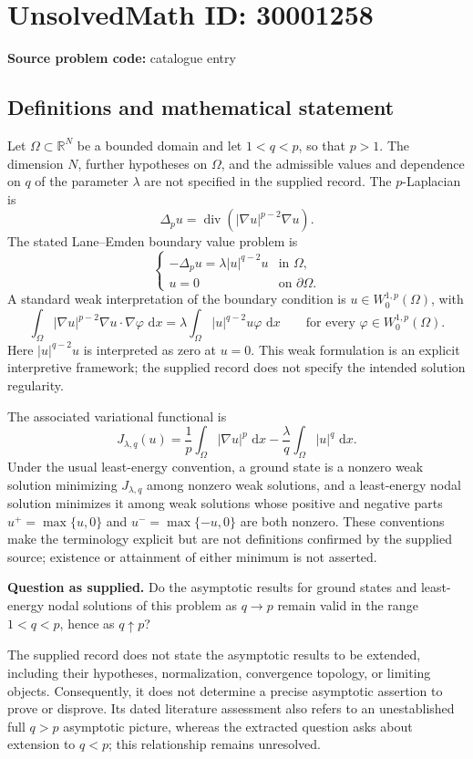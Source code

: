 \documentclass[11pt]{article}
\newcommand{\R}{\mathbb{R}}
\newcommand{\dd}{\,\mathrm{d}}
\begin{document}
\section*{UnsolvedMath ID: 30001258}
\textbf{Source problem code:} catalogue entry
\subsection{Definitions and mathematical statement}
Let \(\Omega\subset\R^N\) be a bounded domain and let \(1<q<p\), so that \(p>1\). The dimension \(N\), further hypotheses on \(\Omega\), and the admissible values and dependence on \(q\) of the parameter \(\lambda\) are not specified in the supplied record. The \(p\)-Laplacian is
\[
\Delta_p u=\operatorname{div}(|\nabla u|^{p-2}\nabla u).
\]
The stated Lane--Emden boundary value problem is
\[
\begin{cases}
-\Delta_pu=\lambda |u|^{q-2}u & \text{in }\Omega,\\
u=0 & \text{on }\partial\Omega.
\end{cases}
\]
A standard weak interpretation of the boundary condition is \(u\in W^{1,p}_0(\Omega)\), with
\[
\int_\Omega |\nabla u|^{p-2}\nabla u\cdot\nabla\varphi\,\dd x
=\lambda\int_\Omega |u|^{q-2}u\varphi\,\dd x
\qquad\text{for every }\varphi\in W^{1,p}_0(\Omega).
\]
Here \(|u|^{q-2}u\) is interpreted as zero at \(u=0\). This weak formulation is an explicit interpretive framework; the supplied record does not specify the intended solution regularity.

The associated variational functional is
\[
J_{\lambda,q}(u)=\frac1p\int_\Omega |\nabla u|^p\,\dd x
-\frac{\lambda}{q}\int_\Omega |u|^q\,\dd x.
\]
Under the usual least-energy convention, a ground state is a nonzero weak solution minimizing \(J_{\lambda,q}\) among nonzero weak solutions, and a least-energy nodal solution minimizes it among weak solutions whose positive and negative parts \(u^+=\max\{u,0\}\) and \(u^-=\max\{-u,0\}\) are both nonzero. These conventions make the terminology explicit but are not definitions confirmed by the supplied source; existence or attainment of either minimum is not asserted.

\textbf{Question as supplied.} Do the asymptotic results for ground states and least-energy nodal solutions of this problem as \(q\to p\) remain valid in the range \(1<q<p\), hence as \(q\uparrow p\)?

The supplied record does not state the asymptotic results to be extended, including their hypotheses, normalization, convergence topology, or limiting objects. Consequently, it does not determine a precise asymptotic assertion to prove or disprove. Its dated literature assessment also refers to an unestablished full \(q>p\) asymptotic picture, whereas the extracted question asks about extension to \(q<p\); this relationship remains unresolved.
\end{document}
